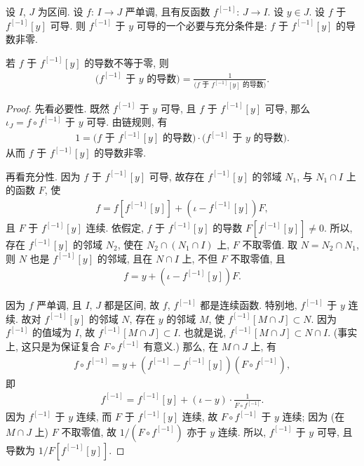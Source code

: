 \begin{theorem}
    设 $I$, $J$ 为区间.
    设 $f$: $I \to J$ 严单调,
    且有反函数 $f^{[-1]}$: $J \to I$.
    设 $y \in J$.
    设 $f$ 于 $f^{[-1]} [y]$ 可导.
    则 $f^{[-1]}$ 于 $y$ 可导的一个必要与充分条件是:
    $f$ 于 $f^{[-1]} [y]$ 的导数非零.

    若 $f$ 于 $f^{[-1]} [y]$ 的导数不等于零, 则
    \begin{align*}
        \text{($f^{[-1]}$ 于 $y$ 的导数)} = \frac{1}{\text{($f$ 于 $f^{[-1]} [y]$ 的导数)}}.
    \end{align*}
\end{theorem}

\begin{proof}
    先看必要性.
    既然 $f^{[-1]}$ 于 $y$ 可导,
    且 $f$ 于 $f^{[-1]} [y]$ 可导,
    那么 $\iota_J = f \circ f^{[-1]}$ 于 $y$ 可导.
    由链规则, 有
    \begin{align*}
        1 = \text{($f$ 于 $f^{[-1]} [y]$ 的导数)} \cdot \text{($f^{[-1]}$ 于 $y$ 的导数)}.
    \end{align*}
    从而 $f$ 于 $f^{[-1]} [y]$ 的导数非零.

    再看充分性.
    因为 $f$ 于 $f^{[-1]} [y]$ 可导,
    故存在 $f^{[-1]} [y]$ 的邻域 $N_1$,
    与 $N_1 \cap I$ 上的函数 $F$, 使
    \begin{align*}
        f = f[f^{[-1]} [y]] + (\iota - f^{[-1]} [y])F,
    \end{align*}
    且 $F$ 于 $f^{[-1]} [y]$ 连续.
    依假定, $f$ 于 $f^{[-1]} [y]$ 的导数
    $F[f^{[-1]} [y]] \neq 0$.
    所以, 存在 $f^{[-1]} [y]$ 的邻域 $N_2$,
    使在 $N_2 \cap (N_1 \cap I)$ 上, $F$ 不取零值.
    取 $N = N_2 \cap N_1$,
    则 $N$ 也是 $f^{[-1]} [y]$ 的邻域,
    且在 $N \cap I$ 上, 不但 $F$ 不取零值, 且
    \begin{align*}
        f = y + (\iota - f^{[-1]} [y])F.
    \end{align*}

    因为 $f$ 严单调, 且 $I$, $J$ 都是区间,
    故 $f$, $f^{[-1]}$ 都是连续函数.
    特别地, $f^{[-1]}$ 于 $y$ 连续.
    故对 $f^{[-1]} [y]$ 的邻域 $N$,
    存在 $y$ 的邻域 $M$, 使 $f^{[-1]} [M \cap J] \subset N$.
    因为 $f^{[-1]}$ 的值域为 $I$,
    故 $f^{[-1]} [M \cap J] \subset I$.
    也就是说, $f^{[-1]} [M \cap J] \subset N \cap I$.
    (事实上, 这只是为保证复合 $F \circ f^{[-1]}$ 有意义.)
    那么, 在 $M \cap J$ 上, 有
    \begin{align*}
        f \circ f^{[-1]} = y + (f^{[-1]} - f^{[-1]} [y]) (F \circ f^{[-1]}),
    \end{align*}
    即
    \begin{align*}
        f^{[-1]} = f^{[-1]} [y] + (\iota - y) \cdot \frac{1}{F \circ f^{[-1]}}.
    \end{align*}
    因为 $f^{[-1]}$ 于 $y$ 连续, 而 $F$ 于 $f^{[-1]} [y]$ 连续,
    故 $F \circ f^{[-1]}$ 于 $y$ 连续;
    因为 (在 $M \cap J$ 上) $F$ 不取零值,
    故 $1/(F \circ f^{[-1]})$ 亦于 $y$ 连续.
    所以, $f^{[-1]}$ 于 $y$ 可导, 且导数为 $1/F[f^{[-1]} [y]]$.
\end{proof}

